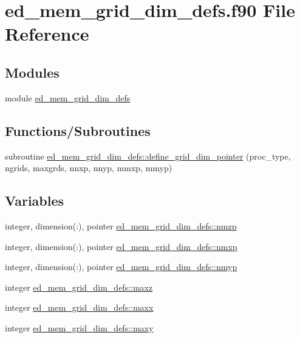 \hypertarget{ed__mem__grid__dim__defs_8f90}{}\section{ed\+\_\+mem\+\_\+grid\+\_\+dim\+\_\+defs.\+f90 File Reference}
\label{ed__mem__grid__dim__defs_8f90}
\subsection*{Modules}
\begin{DoxyCompactItemize}
\item 
module \hyperlink{namespaceed__mem__grid__dim__defs}{ed\+\_\+mem\+\_\+grid\+\_\+dim\+\_\+defs}
\end{DoxyCompactItemize}
\subsection*{Functions/\+Subroutines}
\begin{DoxyCompactItemize}
\item 
subroutine \hyperlink{namespaceed__mem__grid__dim__defs_a036b961a0bfb59f57b9f678b03c9a461}{ed\+\_\+mem\+\_\+grid\+\_\+dim\+\_\+defs\+::define\+\_\+grid\+\_\+dim\+\_\+pointer} (proc\+\_\+type, ngrids, maxgrds, nnxp, nnyp, mmxp, mmyp)
\end{DoxyCompactItemize}
\subsection*{Variables}
\begin{DoxyCompactItemize}
\item 
integer, dimension(\+:), pointer \hyperlink{namespaceed__mem__grid__dim__defs_a1922a1169c2a61922996eb3cb1571231}{ed\+\_\+mem\+\_\+grid\+\_\+dim\+\_\+defs\+::nmzp}
\item 
integer, dimension(\+:), pointer \hyperlink{namespaceed__mem__grid__dim__defs_a57ab8eb1467e9e968a109f132aef7382}{ed\+\_\+mem\+\_\+grid\+\_\+dim\+\_\+defs\+::nmxp}
\item 
integer, dimension(\+:), pointer \hyperlink{namespaceed__mem__grid__dim__defs_a05d50362fba68ca90db983160e8a5213}{ed\+\_\+mem\+\_\+grid\+\_\+dim\+\_\+defs\+::nmyp}
\item 
integer \hyperlink{namespaceed__mem__grid__dim__defs_aff75646038b2a6839b9d2a9faa7672d8}{ed\+\_\+mem\+\_\+grid\+\_\+dim\+\_\+defs\+::maxz}
\item 
integer \hyperlink{namespaceed__mem__grid__dim__defs_a53ce5ed3feaad0ea89bb77b8fc3fa220}{ed\+\_\+mem\+\_\+grid\+\_\+dim\+\_\+defs\+::maxx}
\item 
integer \hyperlink{namespaceed__mem__grid__dim__defs_a83f50efdee1a0d683634a441b608b988}{ed\+\_\+mem\+\_\+grid\+\_\+dim\+\_\+defs\+::maxy}
\end{DoxyCompactItemize}
